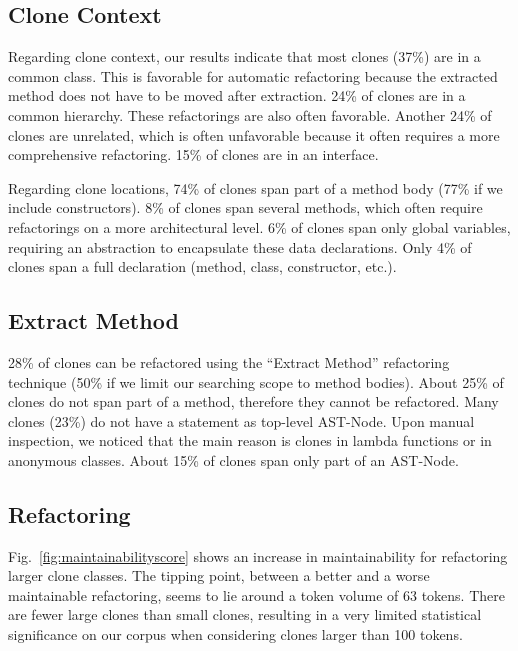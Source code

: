 \documentclass[a4paper,UKenglish,cleveref, autoref, thm-restate,authorcolumns]{lipics-v2019}
\begin{document}

\subsection{Clone Context}
Regarding clone context, our results indicate that most clones (37\%) are in a common class. This is favorable for automatic refactoring because the extracted method does not have to be moved after extraction. 24\% of clones are in a common hierarchy. These refactorings are also often favorable. Another 24\% of clones are unrelated, which is often unfavorable because it often requires a more comprehensive refactoring. 15\% of clones are in an interface. %

Regarding clone locations, 74\% of clones span part of a method body (77\% if we include constructors). 8\% of clones span several methods, which often require refactorings on a more architectural level. 6\% of clones span only global variables, requiring an abstraction to encapsulate these data declarations. Only 4\% of clones span a full declaration (method, class, constructor, etc.).

\subsection{Extract Method}
28\% of clones can be refactored using the ``Extract Method'' refactoring technique (50\% if we limit our searching scope to method bodies). About 25\% of clones do not span part of a method, therefore they cannot be refactored. Many clones (23\%) do not have a statement as top-level AST-Node. Upon manual inspection, we noticed that the main reason is clones in lambda functions or in anonymous classes. About 15\% of clones span only part of an AST-Node.%

\subsection{Refactoring}
Fig.~\ref{fig:maintainabilityscore} shows an increase in maintainability for refactoring larger clone classes. The tipping point, between a better and a worse maintainable refactoring, seems to lie around a token volume of 63 tokens. There are fewer large clones than small clones, resulting in a very limited %
statistical significance on our corpus when considering clones larger than 100 tokens.
\end{document}
